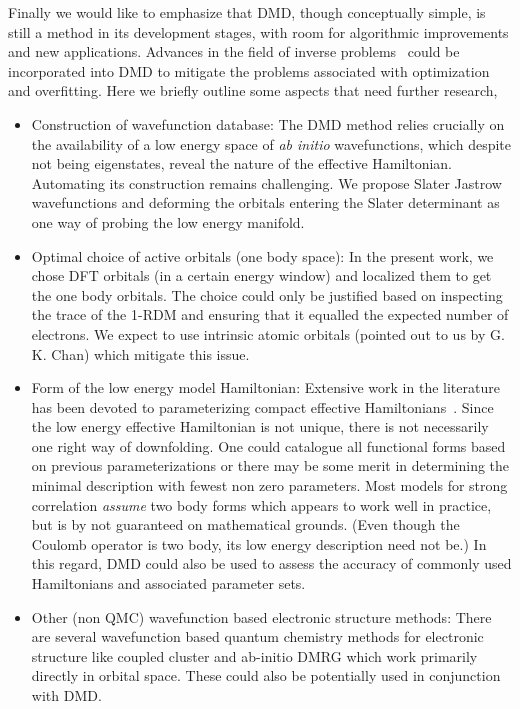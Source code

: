 Finally we would like to emphasize that DMD, though conceptually simple, 
is still a method in its development stages, with room for algorithmic improvements and new applications. 
Advances in the field of inverse problems~\cite{Berg2017} could be incorporated into DMD to 
mitigate the problems associated with optimization and overfitting. 
Here we briefly outline some aspects that need further research,
\begin{itemize} 
	\item Construction of wavefunction database:
	The DMD method relies crucially on the availability of a low energy space of \textit{ab initio} wavefunctions, 
	which despite not being eigenstates, reveal the nature of the effective Hamiltonian. Automating its construction 
	remains challenging. We propose Slater Jastrow wavefunctions and deforming the orbitals entering the Slater 
	determinant as one way of probing the low energy manifold.
	\item Optimal choice of active orbitals (one body space):
	In the present work, we chose DFT orbitals (in a certain energy window) and localized them to get the one body orbitals. 
	The choice could only be justified based on inspecting the trace of the 1-RDM and ensuring that it 
	equalled the expected number of electrons. We expect to use intrinsic atomic orbitals (pointed out to us by G. K. Chan) which 
	mitigate this issue. 
	\item Form of the low energy model Hamiltonian:
	Extensive work in the literature has been devoted to parameterizing compact effective Hamiltonians~\cite{Georges, Oles, Coury}. 
	Since the low energy effective Hamiltonian is not unique, there is not necessarily one right way of downfolding. 
	One could catalogue all functional forms based on previous parameterizations 
	or there may be some merit in determining the minimal description with fewest non zero parameters.
	Most models for strong correlation \textit{assume} two body forms which appears to work well in practice, 
	but is by not guaranteed on mathematical grounds. (Even though the Coulomb operator is two body, 
	its low energy description need not be.) In this regard, DMD could also be used to assess 
	the accuracy of commonly used Hamiltonians and associated parameter sets.
	\item Other (non QMC) wavefunction based electronic structure methods:
	There are several wavefunction based quantum chemistry 
	methods for electronic structure like coupled cluster and ab-initio DMRG which work primarily 
	directly in orbital space. These could also be potentially used in conjunction with DMD.
\end{itemize} 


